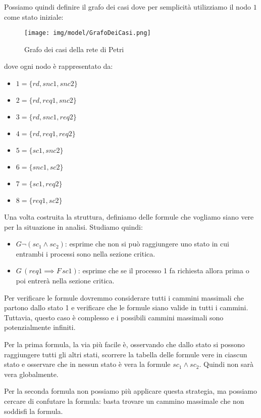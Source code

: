 \begin{esempio}
    Possiamo quindi definire il grafo dei casi dove per semplicità utilizziamo il
    nodo $1$ come stato iniziale:
    \begin{figure}[!ht]
        \centering
        \texttt{[image: img/model/GrafoDeiCasi.png]}
        \caption{Grafo dei casi della rete di Petri}
    \end{figure}
    dove ogni nodo è rappresentato da:
    \begin{itemize}
        \item $1=\{rd,snc1,snc2\}$
        \item $2=\{rd,req1,snc2\}$
        \item $3=\{rd,snc1,req2\}$
        \item $4=\{rd,req1,req2\}$
        \item $5=\{sc1, snc2\}$
        \item $6=\{snc1,sc2\}$
        \item $7=\{sc1, req 2\}$
        \item $8=\{req1,sc2\}$
    \end{itemize}
    Una volta costruita la struttura, definiamo delle formule che vogliamo siano
    vere per la situazione in analisi. Studiamo quindi:
    \begin{itemize}
        \item $G\lnot (sc_1\land sc_2)$: esprime che non si può raggiungere
              uno stato in cui entrambi i processi sono nella sezione critica.
        \item $G\,(req1\implies F\,sc1)$: esprime che se il processo 1 fa richiesta
              allora prima o poi entrerà nella sezione critica.
    \end{itemize}
    Per verificare le formule dovremmo considerare tutti i cammini massimali che
    partono dallo stato 1 e verificare che le formule siano valide in tutti i
    cammini. Tuttavia, questo caso è complesso e i possibili cammini massimali
    sono potenzialmente infiniti.

    Per la prima formula, la via più facile è, osservando che dallo stato si possono raggiungere tutti
    gli altri stati, scorrere la tabella delle formule vere in ciascun stato e
    osservare che in nessun stato è vera la formule $sc_1 \land sc_2$. Quindi non
    sarà vera globalmente.

    Per la seconda formula non possiamo più applicare questa strategia, ma possiamo
    cercare di confutare la formula: basta trovare un cammino massimale che non
    soddisfi la formula.


\end{esempio}
